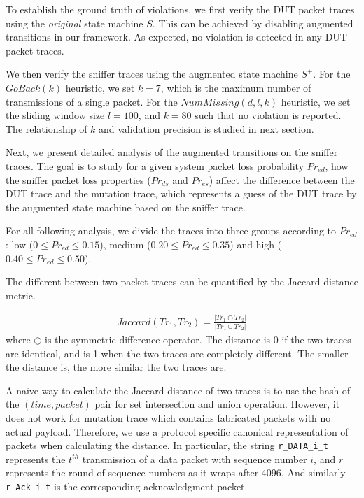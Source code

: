 To establish the ground truth of violations, we first verify the DUT packet
traces using the \textit{original} state machine $S$.  This can be achieved by
disabling augmented transitions in our framework.  As expected, no violation is
detected in any DUT packet traces.

We then verify the sniffer traces using the augmented state machine $S^+$.  For
the $\mathit{GoBack}(k)$ heuristic, we set $k=7$, which is the maximum number of
transmissions of a single packet. For the $\mathit{NumMissing}(d, l, k)$ heuristic, we
set the sliding window size $l=100$, and $k=80$ such that no violation is
reported. The relationship of $k$ and validation precision is studied in next
section.

Next, we present detailed analysis of the augmented transitions on the sniffer
traces. The goal is to study for a given system packet loss probability
$Pr_{ed}$, how the sniffer packet loss properties ($Pr_{ds}$ and $Pr_{es}$)
affect the difference between the DUT trace and the mutation trace, which represents
a guess of the DUT trace by the augmented state machine based on the sniffer
trace.

For all following analysis, we divide the traces into three groups according to
$Pr_{ed}$: low ($0 \le Pr_{ed} \le 0.15$), medium ($0.20 \le Pr_{ed} \le 0.35$)
and high ($0.40 \le Pr_{ed} \le 0.50$).

The different between two packet traces can be quantified by the Jaccard distance
metric.

\begin{align}
  Jaccard(Tr_1, Tr_2) = \frac{\left\vert Tr_1 \ominus Tr_2\right\vert}{\left\vert
  Tr_1 \cup Tr_2\right\vert}
\end{align}%
where $\ominus$ is the symmetric difference operator.  The distance is 0 if the
two traces are identical, and is 1 when the two traces are completely different.
The smaller the distance is, the more similar the two traces are.

A na\"ive way to calculate the Jaccard distance of two traces is to use the hash
of the $(time, packet)$ pair for set intersection and union operation.  However,
it does not work for mutation trace which contains fabricated packets with no
actual payload.  Therefore, we use a protocol specific canonical representation
of packets when calculating the distance.  In particular, the string
\texttt{r\_DATA\_i\_t} represents the $t^{th}$ transmission of a data packet
with sequence number $i$, and $r$ represents the round of sequence numbers as it
wraps after 4096.  And similarly \texttt{r\_Ack\_i\_t} is the corresponding
acknowledgment packet.

